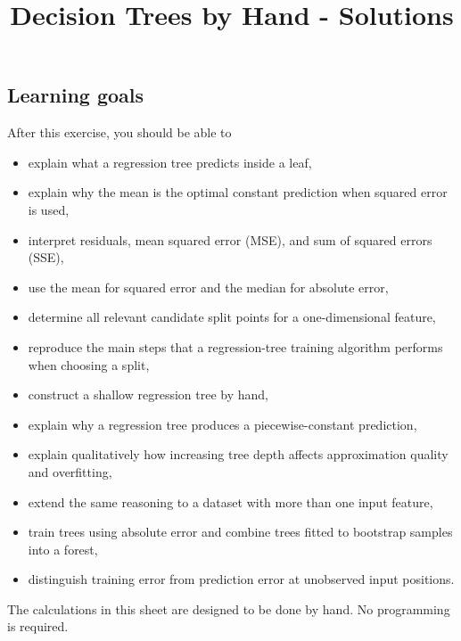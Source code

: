 \documentclass[10pt]{article}
\begin{document}
\title{Decision Trees by Hand - Solutions}
\author{}
\date{}
\maketitle
\subsection*{Learning goals}
After this exercise, you should be able to

\begin{itemize}
\item
explain what a regression tree predicts inside a leaf,

\item
explain why the mean is the optimal constant prediction when squared error is used,

\item
interpret residuals, mean squared error (MSE), and sum of squared errors (SSE),

\item
use the mean for squared error and the median for absolute error,

\item
determine all relevant candidate split points for a one-dimensional feature,

\item
reproduce the main steps that a regression-tree training algorithm performs when choosing a split,

\item
construct a shallow regression tree by hand,

\item
explain why a regression tree produces a piecewise-constant prediction,

\item
explain qualitatively how increasing tree depth affects approximation quality and overfitting,

\item
extend the same reasoning to a dataset with more than one input feature,

\item
train trees using absolute error and combine trees fitted to bootstrap samples into a forest,

\item
distinguish training error from prediction error at unobserved input positions.

\end{itemize}
The calculations in this sheet are designed to be done by hand. No programming is required.
\end{document}
